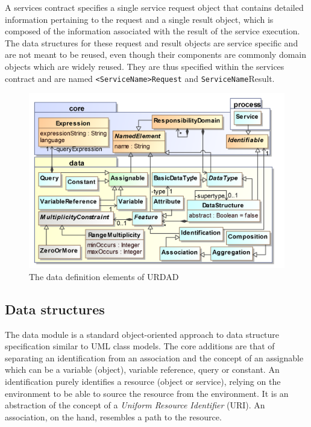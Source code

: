 A services contract specifies a single service request object that contains detailed information pertaining to the request and a single result object, which is composed of the information associated with the result of the service execution. The data structures for these request and result objects are service specific and are not meant to be reused, even though their components are commonly domain objects which are widely reused. They are thus specified within the services contract and are named \verb+<ServiceName>Request+ and \verb+ServiceName+Result.



\begin{figure}[Htbp]
  \centering
  \includegraphics{data}
  \caption{The data definition elements of URDAD}
  \label{fig:metamodel}
\end{figure}

\subsection{Data structures}

The data module is a standard object-oriented approach to data structure specification similar to UML class models. The core additions are that of separating an identification from an association and the concept of an assignable which can be a variable (object), variable reference, query or constant. An identification purely identifies a resource (object or service), relying on the environment to be able to source the resource from the environment. It is an abstraction of the concept of a \emph{Uniform Resource Identifier} (URI). An association, on the hand, resembles a path to the resource.

